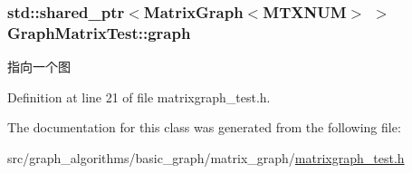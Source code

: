 \subsubsection[{graph}]{\setlength{\rightskip}{0pt plus 5cm}std\+::shared\+\_\+ptr$<${\bf Matrix\+Graph}$<${\bf M\+T\+X\+N\+U\+M}$>$ $>$ Graph\+Matrix\+Test\+::graph\hspace{0.3cm}{\ttfamily [protected]}}\label{class_graph_matrix_test_a466258802e52f0a5408f78e809cd6d7c}
指向一个图 

Definition at line 21 of file matrixgraph\+\_\+test.\+h.



The documentation for this class was generated from the following file\+:\begin{DoxyCompactItemize}
\item 
src/graph\+\_\+algorithms/basic\+\_\+graph/matrix\+\_\+graph/\hyperlink{matrixgraph__test_8h}{matrixgraph\+\_\+test.\+h}\end{DoxyCompactItemize}

